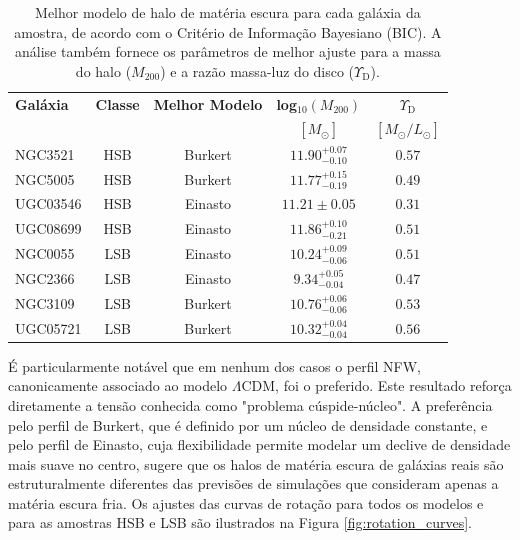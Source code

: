 \documentclass[a4paper]{article}
\begin{document}
\begin{table}[H]
    \centering
    \caption{Melhor modelo de halo de matéria escura para cada galáxia da amostra, de acordo com o Critério de Informação Bayesiano (BIC). A análise também fornece os parâmetros de melhor ajuste para a massa do halo ($M_{200}$) e a razão massa-luz do disco ($\Upsilon_{\text{D}}$).}
    \label{tab:best_models}
    \begin{tabular}{l c c c c}
        \hline
        \textbf{Galáxia} & \textbf{Classe} & \textbf{Melhor Modelo} & \textbf{log$_{10}(M_{200})$} & \textbf{$\Upsilon_{\text{D}}$} \\
        & & & $[M_{\odot}]$ & $[M_{\odot}/L_{\odot}]$ \\
        \hline
        NGC3521 & HSB & Burkert & $11.90^{+0.07}_{-0.10}$ & $0.57$ \\
        NGC5005 & HSB & Burkert & $11.77^{+0.15}_{-0.19}$ & $0.49$ \\
        UGC03546 & HSB & Einasto & $11.21 \pm 0.05$ & $0.31$ \\
        UGC08699 & HSB & Einasto & $11.86^{+0.10}_{-0.21}$ & $0.51$ \\
        \hline
        NGC0055 & LSB & Einasto & $10.24^{+0.09}_{-0.06}$ & $0.51$ \\
        NGC2366 & LSB & Einasto & $9.34^{+0.05}_{-0.04}$ & $0.47$ \\
        NGC3109 & LSB & Burkert & $10.76^{+0.06}_{-0.06}$ & $0.53$ \\
        UGC05721 & LSB & Burkert & $10.32^{+0.04}_{-0.04}$ & $0.56$ \\
        \hline
    \end{tabular}
\end{table}

É particularmente notável que em nenhum dos casos o perfil NFW, canonicamente associado ao modelo $\Lambda$CDM, foi o preferido. Este resultado reforça diretamente a tensão conhecida como "problema cúspide-núcleo". A preferência pelo perfil de Burkert, que é definido por um núcleo de densidade constante, e pelo perfil de Einasto, cuja flexibilidade permite modelar um declive de densidade mais suave no centro, sugere que os halos de matéria escura de galáxias reais são estruturalmente diferentes das previsões de simulações que consideram apenas a matéria escura fria. Os ajustes das curvas de rotação para todos os modelos e para as amostras HSB e LSB são ilustrados na Figura \ref{fig:rotation_curves}.
\end{document}
